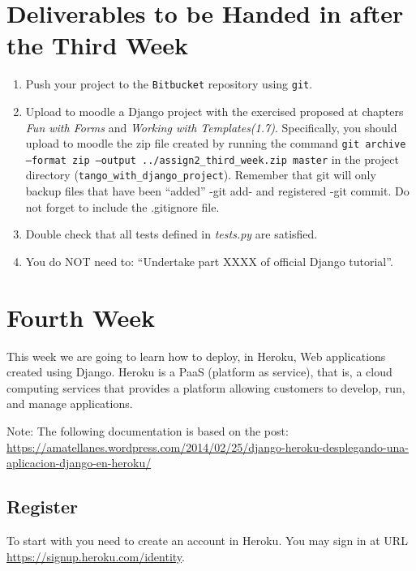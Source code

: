 \documentclass[12pt]{article} %
\newcounter{ejercicioNo}
\begin{document}
\section{Deliverables to be Handed in after the Third Week}

\begin{minipage}{\linewidth}
\begin{framed}
\begin{enumerate}
\item Push your project to the \texttt{Bitbucket} repository using \texttt{git}. 

\item Upload to moodle a Django project with the exercised proposed at chapters \textit{Fun with Forms} and \textit{Working with Templates(1.7)}. Specifically, you should upload to moodle the  zip file created by running the command \texttt{git archive --format zip --output ../assign2\_third\_week.zip  master} in the project directory (\texttt{tango\_with\_django\_project}). Remember that git will only backup files that have been ``added'' -git add- and registered -git commit. Do not forget to include the .gitignore file.

\item Double check that all tests defined in \textit{tests.py} are satisfied.

\item You do NOT need to: ``Undertake part XXXX of official Django tutorial''. 
\end{enumerate}
\end{framed}
\end{minipage}

\section{Fourth Week}
This week we are going to learn how to deploy, in Heroku, Web applications created using Django. Heroku is a PaaS (platform as service), that is, a cloud computing services that provides a platform allowing customers to develop, run, and manage applications.

Note: The following documentation is based on the post: \url{https://amatellanes.wordpress.com/2014/02/25/django-heroku-desplegando-una-aplicacion-django-en-heroku/}

\subsection{Register}
To start with you need to create an account in Heroku. You may sign in at URL \url{https://signup.heroku.com/identity}.
\end{document}
